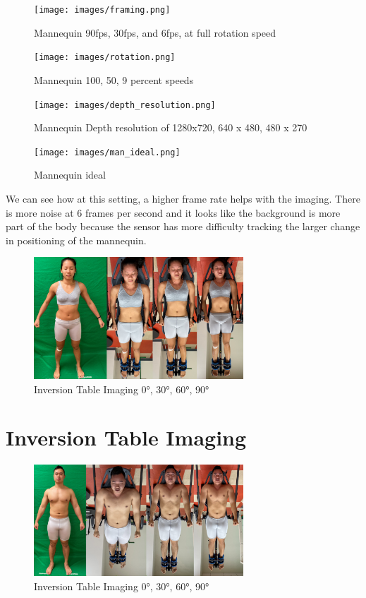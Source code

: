 \begin{figure}[h]
	\caption{Mannequin 90fps, 30fps, and 6fps, at full rotation speed}
	\centering
	\texttt{[image: images/framing.png]}
\end{figure}


\begin{figure}[h]
	\caption{Mannequin 100, 50, 9 percent speeds}
	\centering
	\texttt{[image: images/rotation.png]}
\end{figure}

\begin{figure}[h]
	\caption{Mannequin Depth resolution of 1280x720, 640 x 480, 480 x 270}
	\centering
	\texttt{[image: images/depth\_resolution.png]}
\end{figure}


\begin{figure}[h]
	\caption{Mannequin ideal}
	\centering
	\texttt{[image: images/man\_ideal.png]}
\end{figure}



We can see how at this setting, a higher frame rate helps with the imaging. There is more noise at 6 frames per second and it looks like the background is more part of the body because the sensor has more difficulty tracking the larger change in positioning of the mannequin.
\begin{figure}[h]
	\caption{Inversion Table Imaging \ang{0}, \ang{30}, \ang{60}, \ang{90}}
	\centering
	\includegraphics[width=0.7\textwidth]{images/en_inversion.png}
\end{figure}

\section{Inversion Table Imaging}

\begin{figure}[h]
	\caption{Inversion Table Imaging \ang{0}, \ang{30}, \ang{60}, \ang{90}}
	\centering
	\includegraphics[width=0.7\textwidth]{images/mw_inversion.png}
\end{figure}


